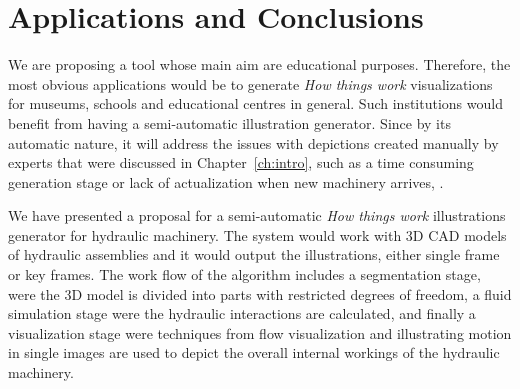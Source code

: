 \chapter{Applications and Conclusions}

We are proposing a tool whose main aim are educational purposes.
Therefore, the most obvious applications would be to generate \textit{How things work} visualizations for museums, schools and educational centres in general.
Such institutions would benefit from having a semi-automatic illustration generator.
Since by its automatic nature, it will address the issues with depictions created manually by experts that were discussed in Chapter~\ref{ch:intro}, such as a time consuming generation stage or lack of actualization when new machinery arrives, .

We have presented a proposal for a semi-automatic \textit{How things work} illustrations generator for hydraulic machinery.
The system would work with 3D CAD models of hydraulic assemblies and it would output the illustrations, either single frame or key frames.
The work flow of the algorithm includes a segmentation stage, were the 3D model is divided into parts with restricted degrees of freedom, a fluid simulation stage were the hydraulic interactions are calculated, and finally a visualization stage were techniques from flow visualization and illustrating motion in single images are used to depict the overall internal workings of the hydraulic machinery.